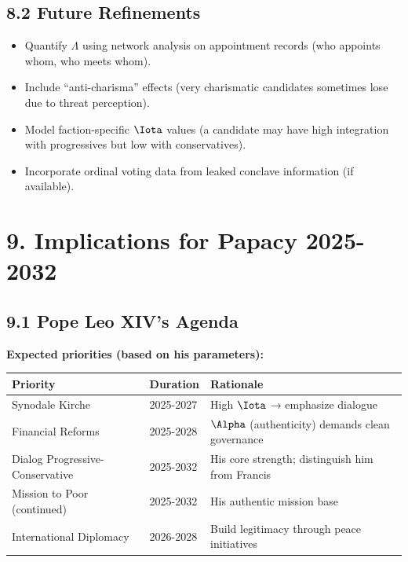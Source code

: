 \documentclass[11pt]{article}
\begin{document}
\subsection{8.2 Future Refinements}

\begin{itemize}
\item Quantify $\Lambda$ using network analysis on appointment records (who appoints whom, who meets whom).
\item Include ``anti-charisma'' effects (very charismatic candidates sometimes lose due to threat perception).
\item Model faction-specific $\Iota$ values (a candidate may have high integration with progressives but low with conservatives).
\item Incorporate ordinal voting data from leaked conclave information (if available).
\end{itemize}

\section{9. Implications for Papacy 2025-2032}

\subsection{9.1 Pope Leo XIV's Agenda}

\textbf{Expected priorities (based on his parameters):}

\begin{table}[h]
\centering
\begin{tabular}{|l|l|l|}
\hline
\textbf{Priority} & \textbf{Duration} & \textbf{Rationale} \\
\hline
Synodale Kirche & 2025-2027 & High $\Iota$ → emphasize dialogue \\
Financial Reforms & 2025-2028 & $\Alpha$ (authenticity) demands clean governance \\
Dialog Progressive-Conservative & 2025-2032 & His core strength; distinguish him from Francis \\
Mission to Poor (continued) & 2025-2032 & His authentic mission base \\
International Diplomacy & 2026-2028 & Build legitimacy through peace initiatives \\
\hline
\end{tabular}
\end{table}
\end{document}
